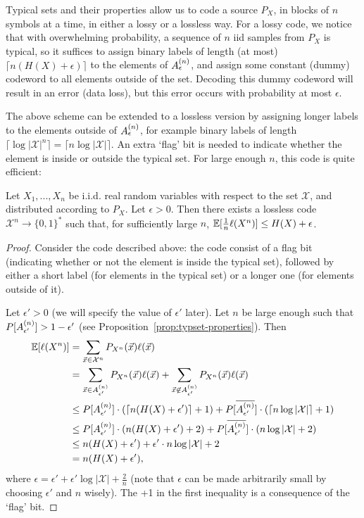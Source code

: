 Typical sets and their properties allow us to code a source $P_X$, in blocks of $n$ symbols at a time, in either a lossy or a lossless way. For a lossy code, we notice that with overwhelming probability, a sequence of $n$ iid samples from $P_X$ is typical, so it suffices to assign binary labels of length (at most) $\lceil n (H(X) + \epsilon)\rceil$ to the elements of $A_{\epsilon}^{(n)}$, and assign some constant (dummy) codeword to all elements outside of the set. Decoding this dummy codeword will result in an error (data loss), but this error occurs with probability at most $\epsilon$.

The above scheme can be extended to a lossless version by assigning longer labels to the elements outside of $A_{\epsilon}^{(n)}$, for example binary labels of length $\lceil \log |\mathcal{X}|^n\rceil = \lceil n \log |\mathcal{X}|\rceil$. An extra `flag' bit is needed to indicate whether the element is inside or outside the typical set. For large enough $n$, this code is quite efficient:
\begin{theorem}
Let $X_1, ..., X_n$ be i.i.d. real random variables with respect to the set $\mathcal{X}$, and distributed according to $P_X$. Let $\epsilon > 0$. Then there exists a lossless code $\mathcal{X}^n \to \{0,1\}^*$ such that, for sufficiently large $n$, $\mathbb{E}[\frac{1}{n} \ell(X^n)] \leq H(X) + \epsilon$.
\end{theorem}
\begin{proof}
Consider the code described above: the code consist of a flag bit (indicating whether or not the element is inside the typical set), followed by either a short label (for elements in the typical set) or a longer one (for elements outside of it).

Let $\epsilon' > 0$ (we will specify the value of $\epsilon'$ later). Let $n$ be large enough such that $P[A_{\epsilon'}^{(n)}] > 1 - \epsilon'$ (see Proposition~\ref{prop:typset-properties}). Then
\begin{align}
\mathbb{E}[\ell(X^n)] &= \sum_{\vec{x} \in \mathcal{X}^n} P_{X^n}(\vec{x}) \ell(\vec{x})\nonumber\\
&= \sum_{\vec{x} \in A_{\epsilon'}^{(n)}} P_{X^n}(\vec{x}) \ell(\vec{x}) + \sum_{\vec{x} \not\in A_{\epsilon'}^{(n)}} P_{X^n}(\vec{x}) \ell(\vec{x})\nonumber\\
&\leq P[A_{\epsilon'}^{(n)}] \cdot (\lceil n (H(X) + \epsilon') \rceil + 1) + P[\overline{A_{\epsilon'}^{(n)}}] \cdot (\lceil n \log |\mathcal{X}| \rceil + 1)\nonumber\\
&\leq P[A_{\epsilon'}^{(n)}] \cdot (n (H(X) + \epsilon') + 2) + P[\overline{A_{\epsilon'}^{(n)}}] \cdot (n \log |\mathcal{X}| + 2)\nonumber\\
&\leq n ( H(X) + \epsilon') + \epsilon' \cdot n \log |\mathcal{X}| + 2\nonumber\\
&= n(H(X) + \epsilon'),
\end{align}
where $\epsilon = \epsilon' + \epsilon' \log |\mathcal{X}| + \frac{2}{n}$ (note that $\epsilon$ can be made arbitrarily small by choosing $\epsilon'$ and $n$ wisely). The +1 in the first inequality is a consequence of the `flag' bit.
\end{proof}

